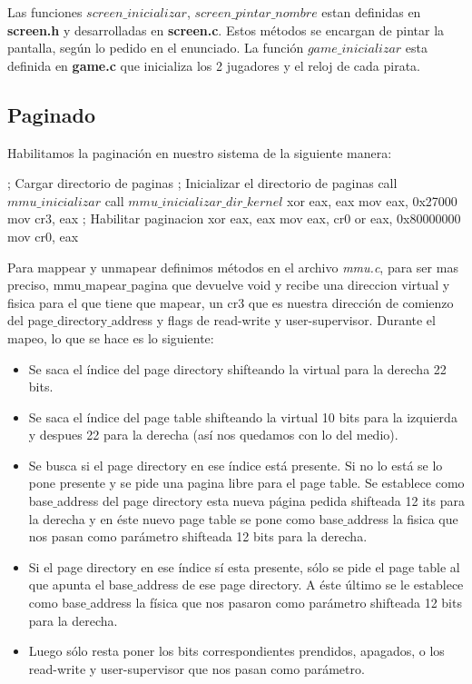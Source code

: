 Las funciones \textit{$screen\_inicializar$}, \textit{$screen\_pintar\_nombre$} estan definidas en \textbf{screen.h} y desarrolladas en \textbf{screen.c}. Estos m\'etodos se encargan de pintar la pantalla, seg\'un lo pedido en el enunciado. La función \textit{$game\_inicializar$} esta definida en \textbf{game.c} que inicializa los 2 jugadores y el reloj de cada pirata.

\subsection{Paginado}
Habilitamos la paginaci\'on en nuestro sistema de la siguiente manera:
\begin{algorithmic}
    \State \tab ; Cargar directorio de paginas
    \State \tab ; Inicializar el directorio de paginas
    \State \tab call $mmu\_inicializar$
    \State \tab call $mmu\_inicializar\_dir\_kernel$
    \State \tab xor eax, eax
    \State \tab mov eax, 0x27000
    \State \tab mov cr3, eax
    \State \tab ; Habilitar paginacion
    \State \tab xor eax, eax
    \State \tab mov eax, cr0
    \State \tab or eax, 0x80000000
    \State \tab mov cr0, eax
\end{algorithmic}

Para mappear y unmapear definimos m\'etodos en el archivo \textit{mmu.c}, para ser mas preciso, mmu$\_$mapear$\_$pagina que devuelve void y recibe una direccion virtual y fisica para el que tiene que mapear, un cr3 que es nuestra dirección de comienzo del page$\_$directory$\_$address y flags de read-write y user-supervisor.
Durante el mapeo, lo que se hace es lo siguiente:
\begin{itemize}
    \item Se saca el índice del page directory shifteando la virtual para la derecha 22 bits.
    \item Se saca el índice del page table shifteando la virtual 10 bits para la izquierda y despues 22 para la derecha (así nos quedamos con lo del medio).
    \item Se busca si el page directory en ese índice está presente. Si no lo está se lo pone presente y se pide una pagina libre para el page table. Se establece como base$\_$address del page directory esta nueva página pedida shifteada 12 its para la derecha y en éste nuevo page table se pone como base$\_$address la fisica que nos pasan como parámetro shifteada 12 bits para la derecha.
    \item Si el page directory en ese índice sí esta presente, sólo se pide el page table al que apunta el base$\_$address de ese page directory. A éste último se le establece como base$\_$address la física que nos pasaron como parámetro shifteada 12 bits para la derecha.
    \item Luego sólo resta poner los bits correspondientes prendidos, apagados, o los read-write y user-supervisor que nos pasan como parámetro.
\end{itemize}


